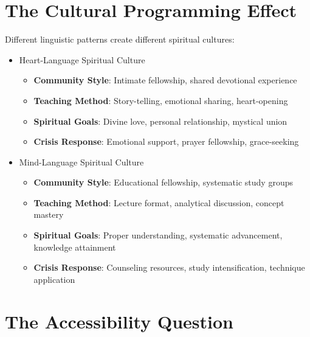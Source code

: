 \documentclass[11pt,twoside]{book}
\begin{document}
\section*{The Cultural Programming Effect}
\label{sec:org41c91a0}

Different linguistic patterns create different spiritual cultures:
\begin{itemize}
\item Heart-Language Spiritual Culture
\label{sec:org82403ee}
\begin{itemize}
\item \textbf{\textbf{Community Style}}: Intimate fellowship, shared devotional experience
\item \textbf{\textbf{Teaching Method}}: Story-telling, emotional sharing, heart-opening
\item \textbf{\textbf{Spiritual Goals}}: Divine love, personal relationship, mystical union
\item \textbf{\textbf{Crisis Response}}: Emotional support, prayer fellowship, grace-seeking
\end{itemize}
\item Mind-Language Spiritual Culture
\label{sec:org04cae8c}
\begin{itemize}
\item \textbf{\textbf{Community Style}}: Educational fellowship, systematic study groups
\item \textbf{\textbf{Teaching Method}}: Lecture format, analytical discussion, concept mastery
\item \textbf{\textbf{Spiritual Goals}}: Proper understanding, systematic advancement, knowledge attainment
\item \textbf{\textbf{Crisis Response}}: Counseling resources, study intensification, technique application
\end{itemize}
\end{itemize}
\section*{The Accessibility Question}
\label{sec:org1688056}
\end{document}
